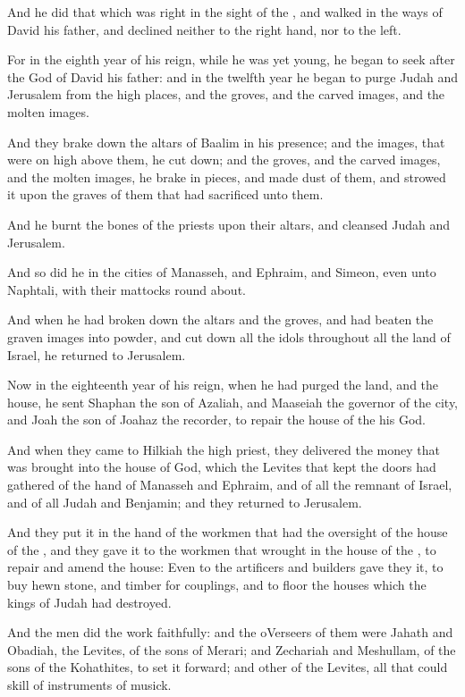 \Verse And he did that which was right in the sight of the \LORD, and walked in the ways of David his father, and declined neither to the right hand, nor to the left.

\Verse For in the eighth year of his reign, while he was yet young, he began to seek after the God of David his father: and in the twelfth year he began to purge Judah and Jerusalem from the high places, and the groves, and the carved images, and the molten images.

\Verse And they brake down the altars of Baalim in his presence; and the images, that were on high above them, he cut down; and the groves, and the carved images, and the molten images, he brake in pieces, and made dust of them, and strowed it upon the graves of them that had sacrificed unto them.

\Verse And he burnt the bones of the priests upon their altars, and cleansed Judah and Jerusalem.

\Verse And so did he in the cities of Manasseh, and Ephraim, and Simeon, even unto Naphtali, with their mattocks round about.

\Verse And when he had broken down the altars and the groves, and had beaten the graven images into powder, and cut down all the idols throughout all the land of Israel, he returned to Jerusalem.

\Verse Now in the eighteenth year of his reign, when he had purged the land, and the house, he sent Shaphan the son of Azaliah, and Maaseiah the governor of the city, and Joah the son of Joahaz the recorder, to repair the house of the \LORD his God.

\Verse And when they came to Hilkiah the high priest, they delivered the money that was brought into the house of God, which the Levites that kept the doors had gathered of the hand of Manasseh and Ephraim, and of all the remnant of Israel, and of all Judah and Benjamin; and they returned to Jerusalem.

\Verse And they put it in the hand of the workmen that had the oversight of the house of the \LORD, and they gave it to the workmen that wrought in the house of the \LORD, to repair and amend the house: \Verse Even to the artificers and builders gave they it, to buy hewn stone, and timber for couplings, and to floor the houses which the kings of Judah had destroyed.

\Verse And the men did the work faithfully: and the oVerseers of them were Jahath and Obadiah, the Levites, of the sons of Merari; and Zechariah and Meshullam, of the sons of the Kohathites, to set it forward; and other of the Levites, all that could skill of instruments of musick.

